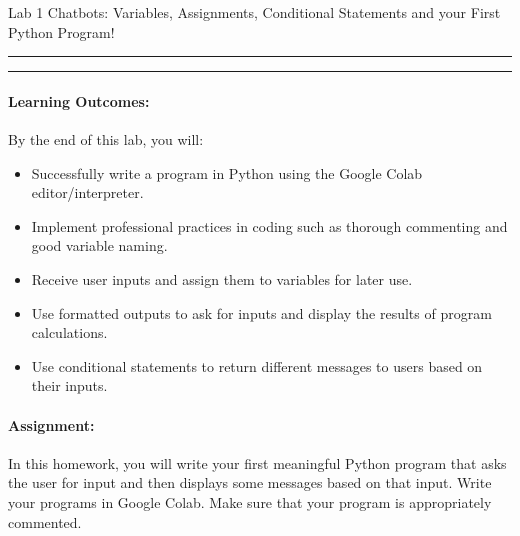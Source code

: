 \documentclass[10pt]{article}
\begin{document}
  \thispagestyle{empty}
  \def\cpp{C{\tt ++}\xspace}

  \begin{bf}
      Lab 1
      \hfill 
      Chatbots: Variables, Assignments, Conditional Statements and your First Python Program!
      \hfill
  \end{bf}

  \vspace*{10pt} \hrule \vspace*{1pt} \hrule

  \vspace*{-10pt}

\vspace*{-15pt}  
  \paragraph{Learning Outcomes:} By the end of this lab, you will:
  \vspace*{-15pt}
\begin{itemize}
\setlength\itemsep{-0.5em}
    \item Successfully write a program in Python using the Google Colab
        editor/interpreter.
    \item Implement professional practices in coding such as 
        thorough commenting and good variable naming.
    \item Receive user inputs and assign them to variables for later use.
    \item Use formatted outputs to ask for inputs and display the results of
        program calculations.
    \item Use conditional statements to return different messages to users based on their inputs.
\end{itemize}
  \vspace*{-15pt}
  \paragraph{Assignment:}
  In this homework, you will write your first meaningful Python program that
  asks the user for input and then displays some messages based on that input.
  Write your programs in Google Colab. Make sure that your program is
  appropriately commented.
\end{document}
